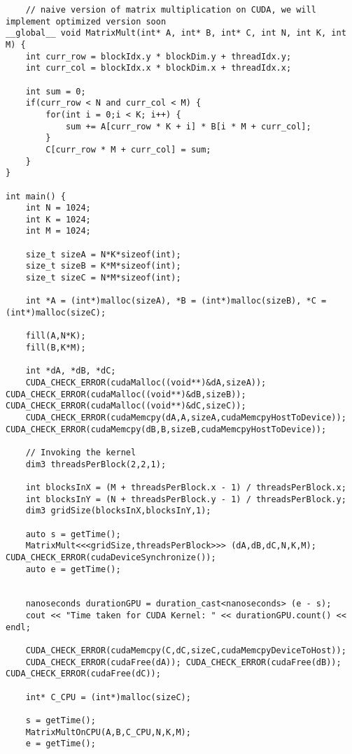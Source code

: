 \newpage


\begin{lstlisting}
    // naive version of matrix multiplication on CUDA, we will implement optimized version soon
__global__ void MatrixMult(int* A, int* B, int* C, int N, int K, int M) {
    int curr_row = blockIdx.y * blockDim.y + threadIdx.y;
    int curr_col = blockIdx.x * blockDim.x + threadIdx.x;

    int sum = 0;
    if(curr_row < N and curr_col < M) {
        for(int i = 0;i < K; i++) {
            sum += A[curr_row * K + i] * B[i * M + curr_col];
        }
        C[curr_row * M + curr_col] = sum;
    }
}

int main() {
    int N = 1024;
    int K = 1024;
    int M = 1024;

    size_t sizeA = N*K*sizeof(int);
    size_t sizeB = K*M*sizeof(int);
    size_t sizeC = N*M*sizeof(int);

    int *A = (int*)malloc(sizeA), *B = (int*)malloc(sizeB), *C = (int*)malloc(sizeC);

    fill(A,N*K);
    fill(B,K*M);

    int *dA, *dB, *dC;
    CUDA_CHECK_ERROR(cudaMalloc((void**)&dA,sizeA)); CUDA_CHECK_ERROR(cudaMalloc((void**)&dB,sizeB)); CUDA_CHECK_ERROR(cudaMalloc((void**)&dC,sizeC));
    CUDA_CHECK_ERROR(cudaMemcpy(dA,A,sizeA,cudaMemcpyHostToDevice)); CUDA_CHECK_ERROR(cudaMemcpy(dB,B,sizeB,cudaMemcpyHostToDevice));

    // Invoking the kernel
    dim3 threadsPerBlock(2,2,1);

    int blocksInX = (M + threadsPerBlock.x - 1) / threadsPerBlock.x;
    int blocksInY = (N + threadsPerBlock.y - 1) / threadsPerBlock.y;
    dim3 gridSize(blocksInX,blocksInY,1);

    auto s = getTime(); 
    MatrixMult<<<gridSize,threadsPerBlock>>> (dA,dB,dC,N,K,M); CUDA_CHECK_ERROR(cudaDeviceSynchronize());
    auto e = getTime();
    

    nanoseconds durationGPU = duration_cast<nanoseconds> (e - s);
    cout << "Time taken for CUDA Kernel: " << durationGPU.count() << endl;

    CUDA_CHECK_ERROR(cudaMemcpy(C,dC,sizeC,cudaMemcpyDeviceToHost));
    CUDA_CHECK_ERROR(cudaFree(dA)); CUDA_CHECK_ERROR(cudaFree(dB)); CUDA_CHECK_ERROR(cudaFree(dC));

    int* C_CPU = (int*)malloc(sizeC);

    s = getTime();
    MatrixMultOnCPU(A,B,C_CPU,N,K,M);
    e = getTime();


\end{lstlisting}
